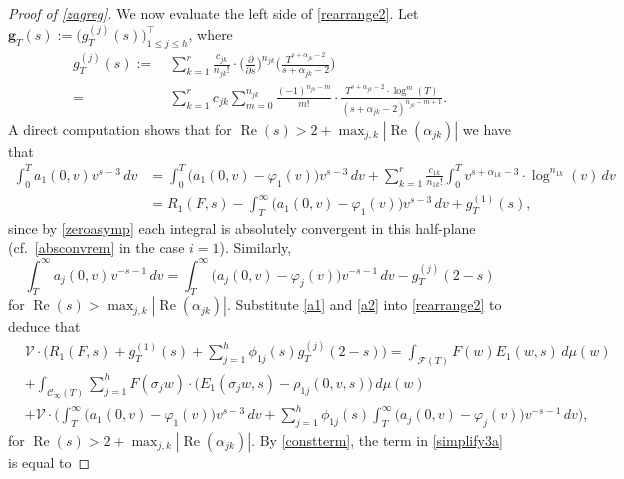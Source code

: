 \documentclass[12pt,reqno]{amsart}
\numberwithin{equation}{section}
\renewcommand{\Re}{\operatorname{Re}}
\begin{document}
\begin{proof}[Proof of \cref{zagreg}]
We now evaluate the left side of \eqref{rearrange2}. Let $\boldsymbol{g}_T(s) := \big( g^{(j)}_T(s) \big)^{\top}_{1 \leq j \leq h }$, where
\begin{align} \label{gTcompute}
    g^{(j)}_T(s) := \ & \sum_{k=1}^{r} \frac{c_{jk}}{n_{jk}!} \cdot \Big(\frac{\partial}{\partial s}\Big)^{n_{jk}} \Big( \frac{T^{s+\alpha_{jk}-2}}{s+\alpha_{jk}-2} \Big)  \nonumber \\
    = \ & \sum_{k=1}^{r} c_{jk} \sum_{m=0}^{n_{jk}} \frac{(-1)^{n_{jk}-m}}{m!} \cdot \frac{T^{s+\alpha_{jk}-2} \cdot \log^m(T)}{(s+\alpha_{jk}-2)^{n_{jk}-m+1}}.
\end{align}
A direct computation shows that for $\Re(s) > 2 + \max_{j,k} \left|\Re(\alpha_{jk})\right|$ we have that
\begin{align} \label{a1}
    \int_{0}^T a_{1}(0,v) v^{s-3} \, dv &= \int_{0}^{T} \big(a_{1}(0,v)-\varphi_{1}(v) \big) v^{s-3} \, dv +\sum_{k=1}^{r} \frac{c_{1k}}{n_{1k}!} \int_{0}^{T} v^{s+\alpha_{1k}-3} \cdot \log^{n_{1k}}(v) \, dv \nonumber \\
    &=R_{1}(F,s) - \int_{T}^{\infty} \big(a_{1}(0,v) - \varphi_{1}(v) \big) v^{s-3} \, dv + g^{(1)}_{T}(s),
\end{align}
since by \eqref{zeroasymp} each integral is absolutely convergent in this half-plane (cf.\ \cref{absconvrem} in the case $i=1$). Similarly,
\begin{equation} \label{a2}
    \int_{T}^{\infty} a_{j}(0,v) v^{-s-1} \, dv = \int_T^{\infty} \big(a_{j}(0,v)-\varphi_{j}(v) \big) v^{-s-1} \, dv - g^{(j)}_{T}(2-s)
\end{equation}
for $\Re(s)>\max_{j, k} \left|\Re(\alpha_{jk})\right|$.
Substitute \eqref{a1} and \eqref{a2} into \eqref{rearrange2} to deduce that 
\begin{align} 
    &\mathcal{V} \cdot \Big(R_{1}(F,s)+ g^{(1)}_{T}(s)+\sum_{j=1}^{h} \phi_{1 j}(s) g^{(j)}_{T}(2-s) \Big) = \int_{\mathcal{F}(T)} F(w) E_{1}(w,s) \, d \mu(w)  \nonumber \\
    &+ \int_{\mathcal{C}_{\infty}(T)}   \sum_{j=1}^{h} F(\sigma_{j} w) \cdot \big(E_{1}( \sigma_{j}w,s)-\rho_{1 j}(0,v,s) \big) \, d \mu(w) \label{simplify1} \\
    &+ \mathcal{V} \cdot \Big( \int_{T}^{\infty} \big(a_{1}(0,v)-\varphi_{1}(v) \big) v^{s-3} \, dv + \sum_{j=1}^{h} \phi_{1 j}(s) \int_{T}^{\infty} \big(a_{j}(0,v)-\varphi_{j}(v) \big) v^{-s-1}\, dv \Big), \qquad \label{simplify3a}
\end{align}
for $\Re(s)>2 + \max_{j,k} \left|\Re(\alpha_{jk})\right|$. By \eqref{constterm}, the term in \eqref{simplify3a} is equal to 

\end{proof}
\end{document}
